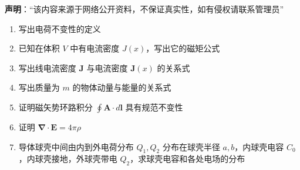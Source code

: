

\textbf{声明}：“该内容来源于网络公开资料，不保证真实性，如有侵权请联系管理员”



\begin{enumerate}
    \item 写出电荷不变性的定义
    \item 已知在体积 $V$ 中有电流密度 $J(x)$，写出它的磁矩公式
    \item 写出线电流密度 $\mathbf{J}$ 与电流密度 $\mathbf{J}(x)$ 的关系式
    \item 写出质量为 $m$ 的物体动量与能量的关系式
    \item 证明磁矢势环路积分 $\oint \mathbf{A} \cdot d\mathbf{l}$ 具有规范不变性
    \item 证明 $\mathbf{\nabla} \cdot \mathbf{E} = 4 \pi \rho$
    \item 导体球壳中间由内到外电荷分布 $Q_1, Q_2$ 分布在球壳半径 $a, b$，内球壳电容 $C_0$，内球壳接地，外球壳带电 $Q_2$，求球壳电容和各处电场的分布
\end{enumerate}


